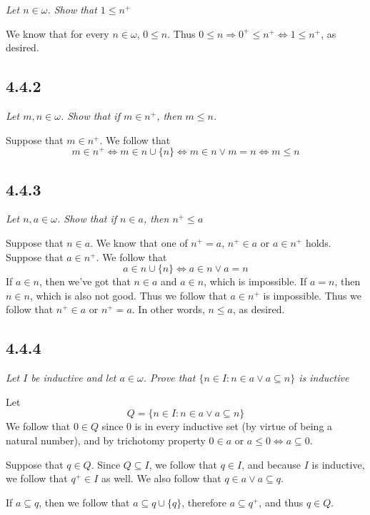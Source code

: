 \documentclass[11pt,oneside,titlepage]{book}
\DeclareMathOperator \lra {\Leftrightarrow}
\DeclareMathOperator \ra {\Rightarrow}
\begin{document}
\textit{Let $n \in \omega$. Show that $1 \leq n^+$}

We know that for every $n \in \omega$, $0 \leq n$.
Thus $0 \leq n \ra 0^+ \leq n^+ \lra 1 \leq n^+$, as desired.

\subsection*{4.4.2}

\textit{Let $m, n \in \omega$. Show that if $m \in n^+$, then $m \leq n$.}

Suppose that $m \in n^+$. We follow that
$$m \in n^+ \lra m \in n \cup \{n\} \lra m \in n \lor m = n \lra m \leq n$$


\subsection*{4.4.3}

\textit{Let $n, a \in \omega$. Show that if $n \in a$, then $n^+ \leq a$}

Suppose that $n \in a$. We know that one of  $n^+ = a$, $n^+ \in a$ or $a \in n^+$ holds.
Suppose that $a \in n^+$. We follow that
$$a \in n \cup \{n\} \lra a \in n \lor a = n$$
If $a \in n$, then we've got that $n \in a$ and $a \in n$, which is impossible. If $a = n$,
then $n \in n$, which is also not good. Thus we follow that $a \in n^+$ is impossible.
Thus we follow that $n^+ \in a$ or $n^+ = a$. In other words, $n \leq a$, as desired.


\subsection*{4.4.4}

\textit{Let $I$ be inductive and let $a \in \omega$. Prove that
  $\{n \in I: n \in a \lor a \subseteq n\}$ is inductive }

Let
$$ Q = \{n \in I: n \in a \lor a \subseteq n\}$$
We follow that $0 \in Q$ since $0$ is in every inductive set (by virtue of being a natural number),
and by trichotomy property $0 \in a$ or $a \leq 0 \lra a \subseteq 0$.

Suppose that $q \in Q$. Since $Q \subseteq I$, we follow that $q \in I$, and
because $I$ is inductive, we follow that $q^+ \in I$ as well.
We also follow that $q \in a \lor a \subseteq q$.

If $a \subseteq q$, then we follow that $a \subseteq q \cup \{q\}$, therefore $a \subseteq q^+$,
and thus $q \in Q$.
\end{document}
